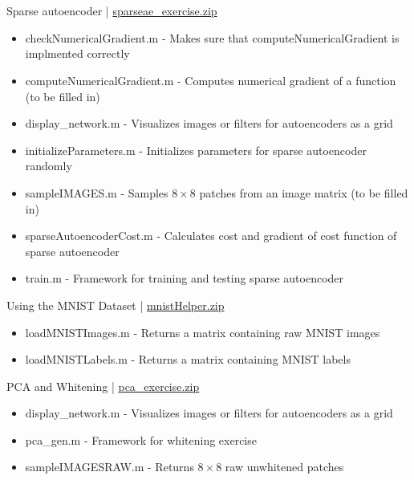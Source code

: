 \section{}

\subsection{}

Sparse autoencoder | \href{http://ufldl.stanford.edu/wiki/resources/sparseae_exercise.zip}{sparseae\_exercise.zip}
\begin{itemize}
  \item checkNumericalGradient.m - Makes sure that computeNumericalGradient is implmented correctly
  \item computeNumericalGradient.m - Computes numerical gradient of a function (to be filled in)
  \item display\_network.m - Visualizes images or filters for autoencoders as a grid
  \item initializeParameters.m - Initializes parameters for sparse autoencoder randomly
  \item sampleIMAGES.m - Samples $8 \times 8$ patches from an image matrix (to be filled in)
  \item sparseAutoencoderCost.m - Calculates cost and gradient of cost function of sparse autoencoder
  \item train.m - Framework for training and testing sparse autoencoder 

\end{itemize}

Using the MNIST Dataset | \href{http://ufldl.stanford.edu/wiki/resources/mnistHelper.zip}{mnistHelper.zip}

\begin{itemize}
  \item loadMNISTImages.m - Returns a matrix containing raw MNIST images
  \item loadMNISTLabels.m - Returns a matrix containing MNIST labels 
\end{itemize}

PCA and Whitening | \href{http://ufldl.stanford.edu/wiki/resources/pca_exercise.zip}{pca\_exercise.zip}

\begin{itemize}
  \item display\_network.m - Visualizes images or filters for autoencoders as a grid
  \item pca\_gen.m - Framework for whitening exercise
  \item sampleIMAGESRAW.m - Returns $8 \times 8$ raw unwhitened patches 
\end{itemize}

